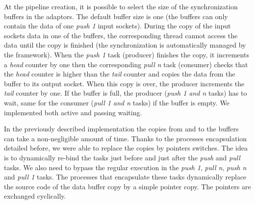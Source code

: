 At the pipeline creation, it is possible to select the size of the
synchronization buffers in the adaptors. The default buffer size is one (the
buffers can only contain the data of one \emph{push 1} input sockets). During
the copy of the input sockets data in one of the buffers, the corresponding
thread cannot access the data until the copy is finished (the synchronization is
automatically managed by the framework). When the \emph{push 1} task (producer)
finishes the copy, it increments a \emph{head} counter by one then the
corresponding \emph{pull n} task (consumer) checks that the \emph{head}
counter is higher than the \emph{tail} counter and copies the data from the
buffer to its output socket. When this copy is over, the producer increments the
\emph{tail} counter by one. If the buffer is full, the producer (\emph{push 1
and n} tasks) has to wait, same for the consumer (\emph{pull 1 and n} tasks) if
the buffer is empty. We implemented both active and passing waiting.


In the previously described implementation the copies from and to the buffers
can take a non-negligible amount of time. Thanks to the processes encapsulation
detailed before, we were able to replace the copies by pointers switches. The
idea is to dynamically re-bind the tasks just before and just after the
\emph{push} and \emph{pull} tasks. We also need to bypass the regular execution
in the \emph{push 1}, \emph{pull n}, \emph{push n} and \emph{pull 1} tasks. The
processes that encapsulate these tasks dynamically replace the source code of
the data buffer copy by a simple pointer copy. The pointers are exchanged
cyclically.

